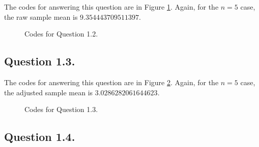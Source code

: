 \documentclass[12pt]{article}
\theoremstyle{definition}
\begin{document}
The codes for answering this question are in Figure \ref{q1_2}. Again, for the $n = 5$ case, the raw sample mean is $9.354443709511397$.

\begin{figure}[H]
    \noindent\caption{Codes for Question 1.2.}
    \begin{center}
        \label{q1_2}
    \end{center}
\end{figure}

\subsection{Question 1.3.}

The codes for answering this question are in Figure \ref{q1_3}. Again, for the $n = 5$ case, the adjusted sample mean is $3.0286282061644623$.

\begin{figure}[H]
    \noindent\caption{Codes for Question 1.3.}
    \begin{center}
        \label{q1_3}
    \end{center}
\end{figure}

\subsection{Question 1.4.}
\end{document}
